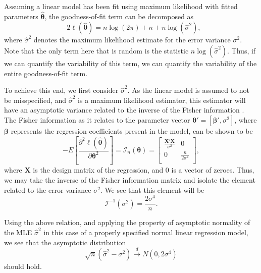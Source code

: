 \documentclass[submit]{smj}
\begin{document}
		Assuming a linear model has been fit using maximum likelihood with fitted parameters $\hat{\bm{\theta}}$, the goodness-of-fit term can be decomposed as
		\begin{equation}
			-2 \ell (\hat{\bm{\theta}}  ) = n \log(2 \pi) + n + n \log(\hat{\sigma}^2 ) ,
		\end{equation}
		where $\hat{\sigma}^2$ denotes the maximum likelihood estimate for the error variance $\sigma^2$. Note that the only term here that is random is
		the statistic $n \log(\hat{\sigma}^2)$. Thus, if we can quantify the variability of this term, we can quantify the variability of the entire goodness-of-fit
		term.

		To achieve this end, we first consider $\hat{\sigma}^2$. As the linear model is assumed to not be misspecified, and $\hat{\sigma}^2$ is a maximum likelihood
		estimator, this estimator will have an asymptotic variance related to the inverse of the Fisher information \citep{Fisher}. The Fisher information as it relates
		to the parameter vector $\bm{\theta}' = [\bm{\beta}', \sigma^2]$, where $\bm{\beta}$ represents the regression coefficients
		present in the model, can be shown to be
		\begin{equation*}
			- E \left[ \frac{\partial^2 \ell (\hat{\bm{\theta}}  )}{\partial \bm{\theta}^2} \right] = \bm{\mathcal{I}}_{n}(\bm{\theta}) =
			\begin{bmatrix}
				\frac{\bm{X}' \bm{X}}{\sigma^2} & 0 \\
				0 & \frac{n}{2 \sigma^4} \\
			\end{bmatrix}
			,
		\end{equation*}
		where $\bm{X}$ is the design matrix of the regression, and $0$ is a vector of zeroes. Thus, we may take the inverse of the Fisher information matrix and isolate
		the element related to the error variance $\sigma^2$. We see that this element will be
		\begin{equation*}
			\bm{\mathcal{I}}^{-1}(\sigma ^2) = \frac{2 \sigma ^4}{n} .
		\end{equation*}
		
		Using the above relation, and applying the property of asymptotic normality of the MLE $\hat{\sigma}^2$ in this case of a properly specified normal linear
		regression model, we see that the asymptotic distribution
		\begin{equation*}
			\sqrt{n} (\hat{\sigma}^2 - \sigma^2) \xrightarrow[]{d} N(0, 2 \sigma ^4 )
		\end{equation*}
		should hold.
\end{document}
